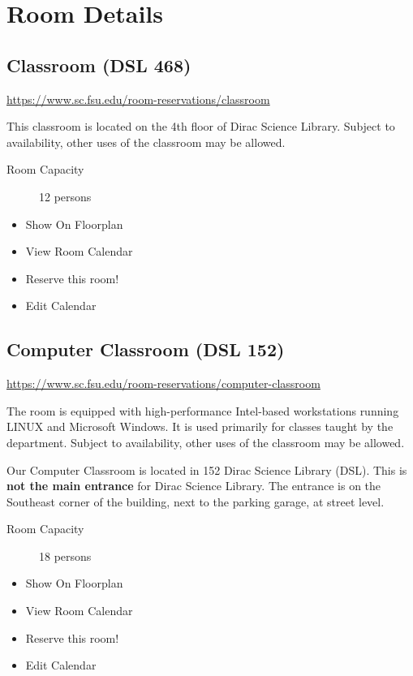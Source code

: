 \documentclass[12pt,a4paper]{article}
\begin{document}
\section{Room Details}

\subsection{Classroom (DSL 468)}
\url{https://www.sc.fsu.edu/room-reservations/classroom}

This classroom is located on the 4th floor of Dirac Science Library. Subject to availability, other uses of the classroom may be allowed.
\begin{description}
    \item[Room Capacity] 12 persons
\end{description}
\begin{itemize}
    \item Show On Floorplan
    \item View Room Calendar
    \item Reserve this room!
    \item Edit Calendar
\end{itemize}

\subsection{Computer Classroom (DSL 152)}
\url{https://www.sc.fsu.edu/room-reservations/computer-classroom}

The room is equipped with high-performance Intel-based workstations running LINUX and Microsoft Windows. It is used primarily for classes taught by the department. Subject to availability, other uses of the classroom may be allowed.

Our Computer Classroom is located in 152 Dirac Science Library (DSL). This is \textbf{not the main entrance} for Dirac Science Library. The entrance is on the Southeast corner of the building, next to the parking garage, at street level.
\begin{description}
    \item[Room Capacity] 18 persons
\end{description}
\begin{itemize}
    \item Show On Floorplan
    \item View Room Calendar
    \item Reserve this room!
    \item Edit Calendar
\end{itemize}
\end{document}
